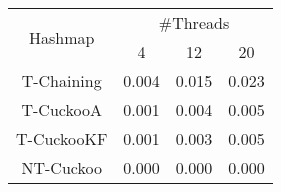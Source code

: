 \begin{tabular}{|c|c|c|c|}
\hline
\multirow{2}{*}{Hashmap} & \multicolumn{3}{c|}{\#Threads}\\\cline{2-4}& 4 & 12 & 20\\
\hline
\hline
T-Chaining & 0.004 & 0.015 & 0.023\\
T-CuckooA & 0.001 & 0.004 & 0.005\\
T-CuckooKF & 0.001 & 0.003 & 0.005\\
NT-Cuckoo & 0.000 & 0.000 & 0.000\\
\hline
\end{tabular}
